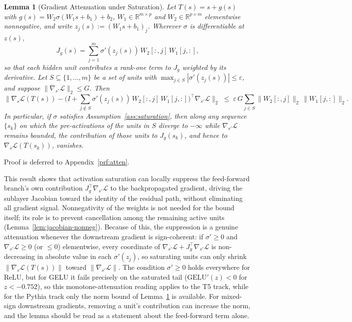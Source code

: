 \documentclass{article}
\theoremstyle{plain}
\newtheorem{lemma}[theorem]{Lemma}
\theoremstyle{definition}
\theoremstyle{remark}
\begin{document}
\begin{lemma}[Gradient Attenuation under Saturation]
\label{lem:gradient-attenuation}
Let $T(s)=s+g(s)$ with $g(s)=W_2\sigma(W_1 s+b_1)+b_2$, $W_1\in\mathbb{R}^{m\times p}$
and $W_2\in\mathbb{R}^{p\times m}$ elementwise nonnegative, and write
$z_j(s) := (W_1 s + b_1)_j$. Wherever $\sigma$ is differentiable at $z(s)$,
\[
J_g(s) = \sum_{j=1}^{m} \sigma'(z_j(s))\, W_2[:,j]\, W_1[j,:],
\]
so that each hidden unit contributes a rank-one term to $J_g$ weighted by its
derivative. Let $S \subseteq \{1,\dots,m\}$ be a set of units with
$\max_{j\in S} |\sigma'(z_j(s))| \le \varepsilon$, and suppose
$\|\nabla_{s'}\mathcal{L}\|_2 \le G$. Then
\[
\Big\| \nabla_s \mathcal{L}(T(s)) - \Big( I + \sum_{j\notin S} \sigma'(z_j(s))\, W_2[:,j]\, W_1[j,:] \Big)^{\!\top} \nabla_{s'}\mathcal{L} \Big\|_2
\;\le\; \varepsilon\, G \sum_{j\in S} \|W_2[:,j]\|_2\, \|W_1[j,:]\|_2 .
\]
In particular, if $\sigma$ satisfies Assumption~\ref{ass:saturation}, then along any
sequence $\{s_k\}$ on which the pre-activations of the units in $S$ diverge to
$-\infty$ while $\nabla_{s'}\mathcal{L}$ remains bounded,
the contribution of those units to $J_g(s_k)$, and hence to
$\nabla_s \mathcal{L}(T(s_k))$, vanishes.
\end{lemma}


Proof is deferred to Appendix~\ref{prf:atten}.

This result shows that activation saturation can locally suppress the feed-forward
branch's own contribution $J_g^\top\nabla_{s'}\mathcal{L}$ to the backpropagated
gradient, driving the sublayer Jacobian toward the identity of the residual path,
without eliminating all gradient signal. Nonnegativity of the weights is not needed
for the bound itself; its role is to prevent cancellation among the remaining active
units (Lemma~\ref{lem:jacobian-nonneg}). Because of this, the suppression is a
genuine attenuation whenever the downstream gradient is sign-coherent: if
$\sigma' \ge 0$ and $\nabla_{s'}\mathcal{L} \ge 0$ (or $\le 0$) elementwise, every
coordinate of $\nabla_{s'}\mathcal{L} + J_g^\top\nabla_{s'}\mathcal{L}$ is
non-decreasing in absolute value in each $\sigma'(z_j)$, so saturating units can
only shrink $\|\nabla_s\mathcal{L}(T(s))\|$ toward $\|\nabla_{s'}\mathcal{L}\|$.
The condition $\sigma' \ge 0$ holds everywhere for ReLU, but for GELU it fails
precisely on the saturated tail ($\mathrm{GELU}'(z) < 0$ for $z < -0.752$), so this
monotone-attenuation reading applies to the T5 track, while for the Pythia track only
the norm bound of Lemma~\ref{lem:gradient-attenuation} is available. For mixed-sign
downstream gradients, removing a unit's contribution can increase the norm, and the
lemma should be read as a statement about the feed-forward term alone.
\end{document}
